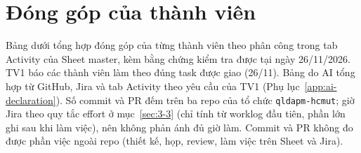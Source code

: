 \chapter{Đóng góp của thành viên}
\label{app:contributions}

Bảng dưới tổng hợp đóng góp của từng thành viên theo phân công trong tab Activity của Sheet master, kèm bằng chứng kiểm tra được tại ngày 26/11/2026. TV1 báo các thành viên làm theo đúng task được giao (26/11). Bảng do AI tổng hợp từ GitHub, Jira và tab Activity theo yêu cầu của TV1 (Phụ lục~\ref{app:ai-declaration}). Số commit và PR đếm trên ba repo của tổ chức \texttt{qldapm-hcmut}; giờ Jira theo quy tắc effort ở mục~\ref{sec:3-3} (chỉ tính từ worklog đầu tiên, phần lớn ghi sau khi làm việc), nên không phản ánh đủ giờ làm. Commit và PR không đo được phần việc ngoài repo (thiết kế, họp, review, làm việc trên Sheet và Jira).

